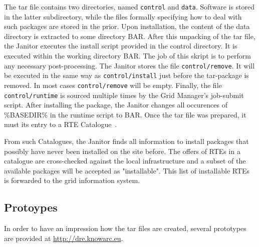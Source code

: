 The tar file contains two directories, named {\tt control} and {\tt data}. Software is stored in the latter subdirectory,
while the files formally specifying how to deal with such packages are stored in the prior. Upon installation,
the content of the data directory is extracted to some directory \textdollar BAR. 
After this unpacking of the tar file, the Janitor executes the install script provided in the control directory. 
It is executed within the working directory \textdollar BAR. The job of this skript is to perform any necessary post-processing.
The Janitor stores the file \texttt{control/remove}. It will be executed in the same way as \texttt{control/install} just
before the tar-package is removed. In most cases \texttt{control/remove} will be empty.
Finally, the file \texttt{control/runtime} is sourced multiple times by the Grid Manager's job-submit script. After
installing the package, the Janitor changes all occurences of \%BASEDIR\% in the runtime script to \textdollar BAR.
Once the tar file was prepared, it must its entry to a RTE Catalogue~\cite[p. 10]{BAYER_2007}.

From such Catalogues, the Janitor finds all information to install packages that possibly have never been installed
on the site before. The offers of RTEs in a catalogue are cross-checked against the local infrastructure and a subset
of the available packages will be accepted as "installable". This list of installable RTEs is forwarded to the
grid information system.

\subsection{Protoypes}

In order to have an impression how the tar files are created, several
prototypes are provided at \url{http://dre.knowarc.eu}.


